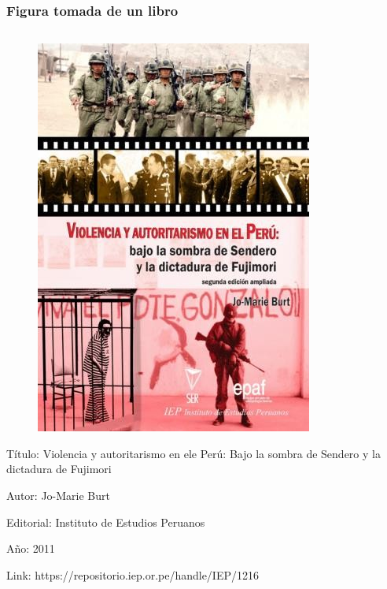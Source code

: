 \documentclass[
11pt, %
]{beamer}
\begin{document}
\begin{frame}
\begin{columns}[c]
\begin{column}{0.5\textwidth}
		\end{column}
	\end{columns}

\end{frame}

\begin{frame}
	\frametitle{Figura tomada de un libro}

	\begin{columns}[c] %
		\begin{column}{0.5\textwidth} %
			\begin{figure}
				\centering
				\includegraphics[width=0.3\linewidth]{images/screenshot009}
			\end{figure}

			\scriptsize{
				Título: Violencia y autoritarismo en ele Perú: Bajo la sombra de Sendero y la dictadura de Fujimori

				Autor: Jo-Marie Burt

				Editorial: Instituto de Estudios Peruanos

				Año: 2011

				Link: https://repositorio.iep.or.pe/handle/IEP/1216}


\end{column}
\end{columns}
\end{frame}
\end{document}
